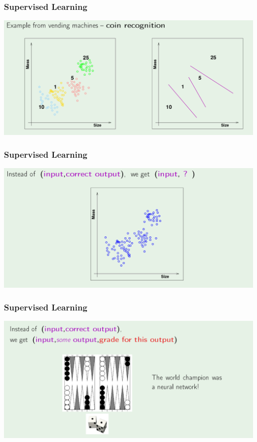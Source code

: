 \documentclass[xcolor=table]{beamer}
\begin{document}
\begin{frame}[t]
\frametitle{Supervised Learning}
\begin{center}
\includegraphics[scale=0.22]{supervised_learning.png}
\end{center}
\end{frame}

\begin{frame}[t]
\frametitle{Supervised Learning}
\begin{center}
\includegraphics[scale=0.22]{unsupervised_learning.png}
\end{center}
\end{frame}

\begin{frame}[t]
\frametitle{Supervised Learning}
\begin{center}
\includegraphics[scale=0.22]{reinforced_learning.png}
\end{center}
\end{frame}
\end{document}
